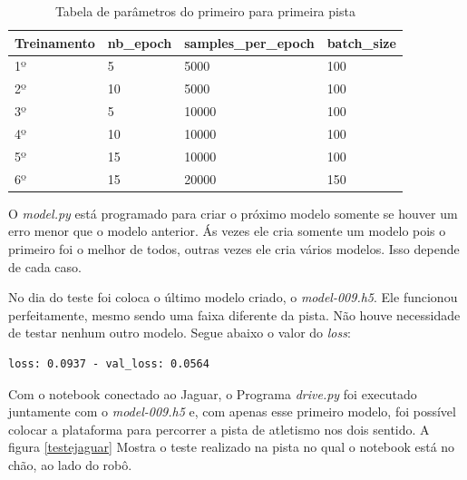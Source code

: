 \begin{table}[H]
\centering
\caption{ Tabela de parâmetros do primeiro para primeira pista}
\label{parametros1}
\begin{tabular}{|l|l|l|l|}
\hline
\textbf{Treinamento} & \textbf{nb\_epoch} & \textbf{samples\_per\_epoch} & \textbf{batch\_size} \\ \hline
1º        & 5         & 5000                & 100         \\ 
2º        & 10        & 5000                & 100         \\ 
3º        & 5         & 10000               & 100         \\ 
4º        & 10        & 10000               & 100         \\ 
5º        & 15        & 10000               & 100         \\ 
6º        & 15        & 20000               & 150         \\ \hline
\end{tabular}
\end{table}

O \textit{model.py} está programado para criar o próximo modelo somente se houver um erro menor que o modelo anterior. Ás vezes ele cria somente um modelo pois o primeiro foi o melhor de todos, outras vezes ele cria vários modelos. Isso depende de cada caso.

No dia do teste foi coloca o último modelo criado, o \textit{model-009.h5}. Ele funcionou perfeitamente, mesmo sendo uma faixa diferente da pista. Não houve necessidade de testar nenhum outro modelo. Segue abaixo o valor do \textit{loss}:

\begin{lstlisting}
loss: 0.0937 - val_loss: 0.0564
\end{lstlisting}

Com o notebook conectado ao Jaguar, o Programa \textit{drive.py} foi executado juntamente com o \textit{model-009.h5} e, com apenas esse primeiro modelo, foi possível colocar a plataforma para percorrer a pista de atletismo nos dois sentido. A figura \ref{testejaguar} Mostra o teste realizado na pista no qual o notebook está no chão, ao lado do robô.

